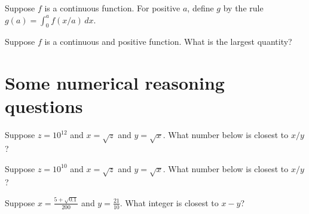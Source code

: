 \documentclass{ximera}
\begin{document}
\begin{problem}
  Suppose $f$ is a continuous function.  For positive $a$, define $g$ by the rule $g(a) = \int_0^a f(x/a) \, dx$.
  \begin{multipleChoice}
  \end{multipleChoice}
\end{problem}

\begin{problem}
  Suppose $f$ is a continuous and positive function.  What is the largest quantity?
  \begin{multipleChoice}
  \end{multipleChoice}
\end{problem}


\section{Some numerical reasoning questions}

\begin{problem}
  Suppose $z = 10^{12}$ and $x = \sqrt{z}$ and $y = \sqrt{x}$.  What number below is closest to $x/y$?
  \begin{multipleChoice}
  \end{multipleChoice}
\end{problem}

\begin{problem}
  Suppose $z = 10^{10}$ and $x = \sqrt{z}$ and $y = \sqrt{x}$.  What number below is closest to $x/y$?
  \begin{multipleChoice}
  \end{multipleChoice}
\end{problem}

\begin{problem}
  Suppose $x = \frac{5 + \sqrt{0.1}}{200}$ and $y = \frac{21}{10}$.  What integer is closest to $x - y$?
  \begin{multipleChoice}
  \end{multipleChoice}
\end{problem}
\end{document}

